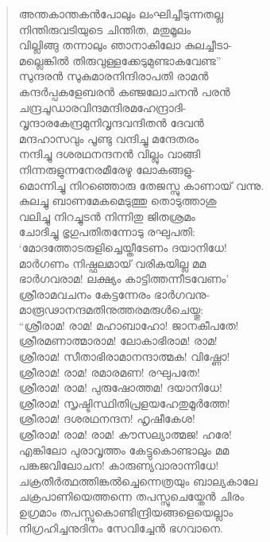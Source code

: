 \begin{verse}
അന്തകാന്തകന്‍പോലും ലംഘിച്ചീടുന്നതല്ല\\
നിന്തിരുവടിയുടെ ചിന്തിത, മതുമൂലം\\
വില്ലിങ്ങു തന്നാലും ഞാനാകിലോ കുലച്ചീടാ-\\
മല്ലെങ്കില്‍ തിരുവുള്ളക്കേടുമുണ്ടാകവേണ്ട”\\
സുന്ദരന്‍ സുകുമാരനിന്ദിരാപതി രാമന്‍\\
കന്ദര്‍പ്പകളേബരന്‍ കഞ്ജലോചനന്‍ പരന്‍\\
ചന്ദ്രചൂഡാരവിന്ദമന്ദിരമഹേന്ദ്രാദി-\\
വൃന്ദാരകേന്ദ്രമുനിവൃന്ദവന്ദിതന്‍ ദേവന്‍\\
മന്ദഹാസവും പൂണ്ടു വന്ദിച്ചു മന്ദേതരം\\
നന്ദിച്ചു ദശരഥനന്ദനന്‍ വില്ലും വാങ്ങി\\
നിന്നരുളുന്നനേരമീരേഴു ലോകങ്ങളു-\\
മൊന്നിച്ചു നിറഞ്ഞൊരു തേജസ്സു കാണായ് വന്നു.\\
കുലച്ചു ബാണമേകമെടുത്തു തൊടുത്താശു\\
വലിച്ചു നിറച്ചുടന്‍ നിന്നിതു ജിതശ്രമം\\
ചോദിച്ചു ഭൃഗുപതിതന്നോടു രഘുപതി:\\
‘മോദത്തോടരുളിച്ചെയ്തീടേണം ദയാനിധേ!\\
മാര്‍ഗണം നിഷ്ഫലമായ് വരികയില്ല മമ\\
ഭാര്‍ഗവരാമ! ലക്ഷ്യം കാട്ടിത്തന്നീടവേണം’\\
ശ്രീരാമവചനം കേട്ടന്നേരം ഭാര്‍ഗവനു-\\
മാരൂഢാനന്ദമതിനുത്തരമരുള്‍ചെയ്തു:\\
“ശ്രീരാമ! രാമ! മഹാബാഹോ! ജാനകീപതേ!\\
ശ്രീരമണാത്മാരാമ! ലോകാഭിരാമ! രാമ!\\
ശ്രീരാമ! സീതാഭിരാമാനന്ദാത്മക! വിഷ്ണോ!\\
ശ്രീരാമ! രാമ! രമാരമണ! രഘുപതേ!\\
ശ്രീരാമ! രാമ! പുരുഷോത്തമ! ദയാനിധേ!\\
ശ്രീരാമ! സൃഷ്ടിസ്ഥിതിപ്രളയഹേതുമൂര്‍ത്തേ!\\
ശ്രീരാമ! ദശരഥനന്ദന! ഹൃഷീകേശ!\\
ശ്രീരാമ! രാമ! രാമ! കൗസല്യാത്മജ! ഹരേ!\\
എങ്കിലോ പുരാവൃത്തം കേട്ടുകൊണ്ടാലും മമ\\
പങ്കജവിലോചന! കാരുണ്യവാരാന്നിധേ!\\
ചക്രതീര്‍ത്ഥത്തിങ്കല്‍ച്ചെന്നെത്രയും ബാല്യകാലേ\\
ചക്രപാണിയെത്തന്നെ തപസ്സുചെയ്തേന്‍ ചിരം\\
ഉഗ്രമാം തപസ്സുകൊണ്ടിന്ദ്രിയങ്ങളെയെല്ലാം\\
നിഗ്രഹിച്ചനുദിനം സേവിച്ചേന്‍ ഭഗവാനെ.\\

\end{verse}
